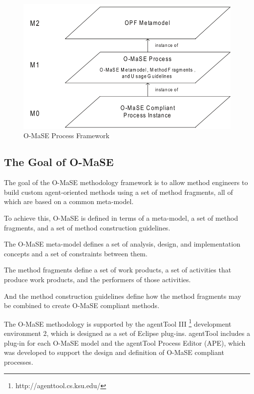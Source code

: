 \begin{figure}[th]
	\centering %
		\includegraphics[scale=0.4]{ch1/img/omase}
	\caption{\label{fig:O-MaSE Process Framework}O-MaSE Process Framework \cite{omacs4}}
\end{figure}
\subsection{The Goal of O-MaSE}

The goal of the O-MaSE methodology framework is to allow method engineers to
build custom agent-oriented methods using a set of method fragments, all of which are
based on a common meta-model\cite{omacs7}.

To achieve this, O-MaSE is defined in terms of a meta-model, a set of method fragments, 
and a set of method construction guidelines. 

The O-MaSE meta-model defines a set of analysis, design, and implementation concepts and a
set of constraints between them. 

The method fragments define a set of work products, a set of activities that produce work products, and the performers of those activities.

And the method construction guidelines define how the method fragments may be
combined to create O-MaSE compliant methods.

The O-MaSE methodology is supported by the agentTool III \footnote{http://agenttool.cs.ksu.edu/}
 development environment 2, 
which is designed as a set of Eclipse plug-ins. agentTool includes a plug-in for each O-MaSE model 
and the agentTool Process Editor (APE), which was developed to support the design and definition 
of O-MaSE compliant processes\cite{omacs7}.

